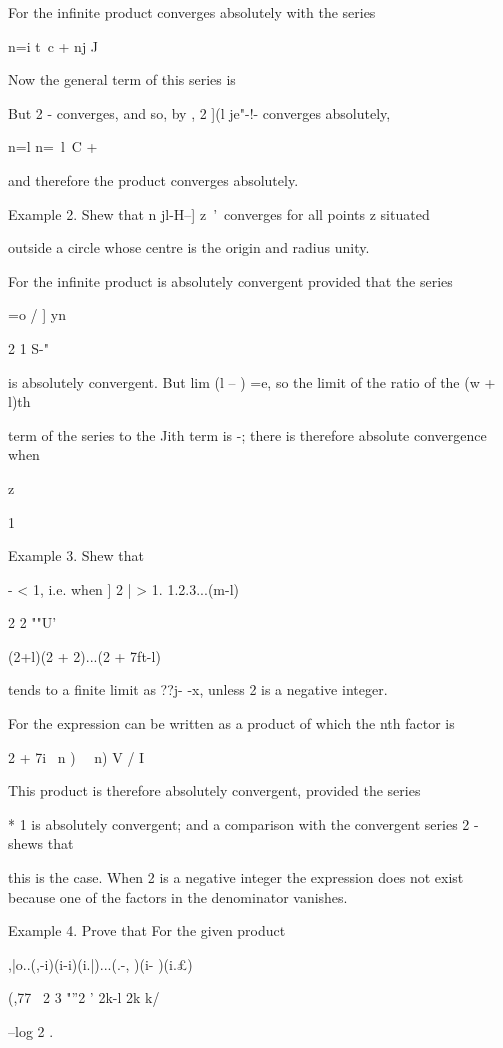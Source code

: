 For the infinite product converges absolutely with the series

n=i t\ c + nj J

%
%

Now the general term of this series is

But 2 - converges, and so, by , 2 ](l je"-!- converges
absolutely,

n=l n=\ l\ C + %

and therefore the product converges absolutely.

Example 2. Shew that n jl-H--] z~'\ converges for all points z
situated

outside a circle whose centre is the origin and radius unity.

For the infinite product is absolutely convergent provided that the
series

=o / ] yn

2 1 S-"

is absolutely convergent. But lim (l -- ) =e, so the limit of the
ratio of the (w + l)th

term of the series to the Jith term is -; there is therefore absolute
convergence when

z

1

Example 3. Shew that

- < 1, i.e. when ] 2 | > 1. 1.2.3...(m-l)

2 2 ""U'

(2+l)(2 + 2)...(2 + 7ft-l)

tends to a finite limit as ??j- -x, unless 2 is a negative integer.

For the expression can be written as a product of which the nth factor
is

2 + 7i \ n ) ~\ n) V / I

This product is therefore absolutely convergent, provided the series

* 1 is absolutely convergent; and a comparison with the convergent
series 2 - shews that

this is the case. When 2 is a negative integer the expression does not
exist because one of the factors in the denominator vanishes.

Example 4. Prove that For the given product

,|o..(,-i)(i-i)(i.|)...(.-, )(i- )(i.£)

(,77 \ 2 3 "''2 ' 2k-l 2k k/

--log 2 .

